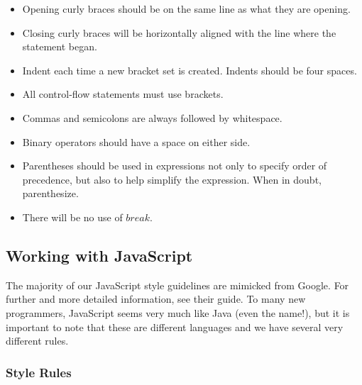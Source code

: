 \documentclass[12pt]{article}
\begin{document}
\begin{itemize}

\item Opening curly braces should be on the same line as what they are opening.

\item Closing curly braces will be horizontally aligned with the line where the statement began.

\item Indent each time a new bracket set is created.  Indents should be four spaces.

\item All control-flow statements must use brackets.

\item Commas and semicolons are always followed by whitespace.

\item Binary operators should have a space on either side.

\item Parentheses should be used in expressions not only to specify order of precedence, but also to help simplify the expression. When in doubt, parenthesize.

\item There will be no use of $break$.

\end{itemize}





\subsection{Working with JavaScript}

The majority of our JavaScript style guidelines are mimicked from Google\cite{JavaScriptStyle-Google}.  For further and more detailed information, see their guide.  To many new programmers, JavaScript seems very much like Java (even the name!), but it is important to note that these are different languages and we have several very different rules.



\subsubsection{Style Rules}
\end{document}
